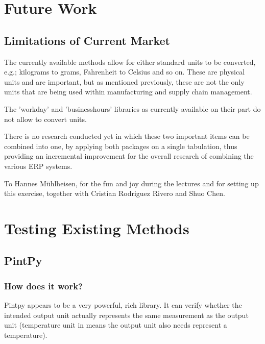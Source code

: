 \documentclass[sigchi, nonacm]{acmart}
\begin{document}
\section{Future Work}

\subsection{Limitations of Current Market}
The currently available methods allow for either standard units to be converted, e.g.; kilograms to grams, Fahrenheit to Celsius and so on. These are physical units and are important, but as mentioned previously, these are not the only units that are being used within manufacturing and supply chain management.

The 'workday' and 'businesshours' libraries as currently available on their part do not allow to convert units. 

There is no research conducted yet in which these two important items can be combined into one, by applying both packages on a single tabulation, thus providing an incremental improvement for the overall research of combining the various ERP systems.




\begin{acks}
To Hannes Mühlheisen, for the fun and joy during the lectures and for setting up this exercise, together with Cristian Rodriguez Rivero and Shuo Chen.
\end{acks}





\appendix

\section{Testing Existing Methods}


\subsection{PintPy}
\subsubsection{How does it work?}
Pintpy appears to be a very powerful, rich library. It can verify whether the intended output unit actually represents the same measurement as the output unit (temperature unit in means the output unit also needs represent a temperature).
\end{document}
